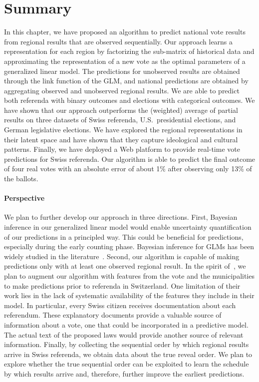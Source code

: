 \section{Summary}%
\label{pdk:sec:conclusion}

In this chapter, we have proposed an algorithm to predict national vote results from regional results that are observed sequentially.
Our approach learns a representation for each region by factorizing the sub-matrix of historical data and approximating the representation of a new vote as the optimal parameters of a generalized linear model.
The predictions for unobserved results are obtained through the link function of the GLM, and national predictions are obtained by aggregating observed and unobserved regional results.
We are able to predict both referenda with binary outcomes and elections with categorical outcomes.
We have shown that our approach outperforms the (weighted) average of partial results on three datasets of Swiss referenda, U.S.\ presidential elections, and German legislative elections.
We have explored the regional representations in their latent space and have shown that they capture ideological and cultural patterns.
Finally, we have deployed a Web platform to provide real-time vote predictions for Swiss referenda.
Our algorithm is able to predict the final outcome of four real votes with an absolute error of about 1\% after observing only 13\% of the ballots.

\paragraph{Perspective}

We plan to further develop our approach in three directions.
First, Bayesian inference in our generalized linear model would enable uncertainty quantification of our predictions in a principled way.
This could be beneficial for predictions, especially during the early counting phase.
Bayesian inference for GLMs has been widely studied in the literature~\citep{murphy2012machine}.
Second, our algorithm is capable of making predictions only with at least one observed regional result.
In the spirit of~\citet{etter2016online}, we plan to augment our algorithm with features from the vote and the municipalities to make predictions prior to referenda in Switzerland.
One limitation of their work lies in the lack of systematic availability of the features they include in their model.
In particular, every Swiss citizen receives documentation about each referendum.
These explanatory documents provide a valuable source of information about a vote, one that could be incorporated in a predictive model.
The actual text of the proposed laws would provide another source of relevant information.
Finally, by collecting the sequential order by which regional results arrive in Swiss referenda, we obtain data about the true reveal order.
We plan to explore whether the true sequential order can be exploited to learn the schedule by which results arrive and, therefore, further improve the earliest predictions.
